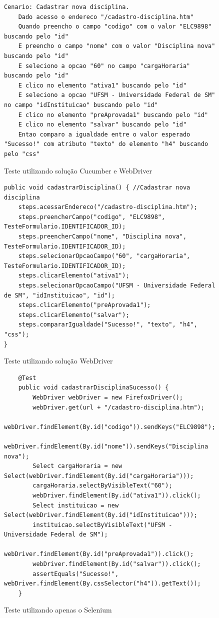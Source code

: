\documentclass[tg]{mdtufsm}
\begin{document}
\begin{figure}[!htt]
	\begin{lstlisting}
Cenario: Cadastrar nova disciplina.
    Dado acesso o endereco "/cadastro-disciplina.htm"
    Quando preencho o campo "codigo" com o valor "ELC9898" buscando pelo "id"
    E preencho o campo "nome" com o valor "Disciplina nova" buscando pelo "id"
    E seleciono a opcao "60" no campo "cargaHoraria" buscando pelo "id"
    E clico no elemento "ativa1" buscando pelo "id"
    E seleciono a opcao "UFSM - Universidade Federal de SM" no campo "idInstituicao" buscando pelo "id"
    E clico no elemento "preAprovada1" buscando pelo "id"
    E clico no elemento "salvar" buscando pelo "id"
    Entao comparo a igualdade entre o valor esperado "Sucesso!" com atributo "texto" do elemento "h4" buscando pelo "css"
	\end{lstlisting}
	\caption{Teste utilizando solução Cucumber e WebDriver}
	\label{code:solucao2AddDisciplina}
\end{figure}

\begin{figure}[!htt]
	\begin{lstlisting}
public void cadastrarDisciplina() { //Cadastrar nova disciplina
    steps.acessarEndereco("/cadastro-disciplina.htm");
    steps.preencherCampo("codigo", "ELC9898", TesteFormulario.IDENTIFICADOR_ID);
    steps.preencherCampo("nome", "Disciplina nova", TesteFormulario.IDENTIFICADOR_ID);
    steps.selecionarOpcaoCampo("60", "cargaHoraria", TesteFormulario.IDENTIFICADOR_ID);
    steps.clicarElemento("ativa1");
    steps.selecionarOpcaoCampo("UFSM - Universidade Federal de SM", "idInstituicao", "id");
    steps.clicarElemento("preAprovada1");
    steps.clicarElemento("salvar");
    steps.compararIgualdade("Sucesso!", "texto", "h4", "css");
}
	\end{lstlisting}
	\caption{Teste utilizando solução WebDriver}
	\label{code:solucao3AddDisciplina}
\end{figure}

\begin{figure}[!htt]
	\begin{lstlisting}
	@Test
	public void cadastrarDisciplinaSucesso() {
		WebDriver webDriver = new FirefoxDriver();
		webDriver.get(url + "/cadastro-disciplina.htm");
		webDriver.findElement(By.id("codigo")).sendKeys("ELC9898");
		webDriver.findElement(By.id("nome")).sendKeys("Disciplina nova");
		Select cargaHoraria = new Select(webDriver.findElement(By.id("cargaHoraria")));
		cargaHoraria.selectByVisibleText("60");
		webDriver.findElement(By.id("ativa1")).click();
		Select instituicao = new Select(webDriver.findElement(By.id("idInstituicao")));
		instituicao.selectByVisibleText("UFSM - Universidade Federal de SM");
		webDriver.findElement(By.id("preAprovada1")).click();
		webDriver.findElement(By.id("salvar")).click();
		assertEquals("Sucesso!", webDriver.findElement(By.cssSelector("h4")).getText());
	}
	\end{lstlisting}
	\caption{Teste utilizando apenas o Selenium}
	\label{code:seleniumAddDisciplina}
\end{figure}
\end{document}
